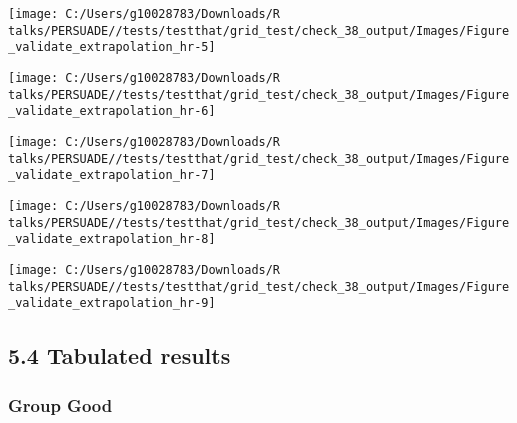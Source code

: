 \documentclass[
]{article}
\begin{document}
\begin{flushleft}\texttt{[image: C:/Users/g10028783/Downloads/R talks/PERSUADE//tests/testthat/grid\_test/check\_38\_output/Images/Figure\_validate\_extrapolation\_hr-5]} \end{flushleft}

\begin{flushleft}\texttt{[image: C:/Users/g10028783/Downloads/R talks/PERSUADE//tests/testthat/grid\_test/check\_38\_output/Images/Figure\_validate\_extrapolation\_hr-6]} \end{flushleft}

\begin{flushleft}\texttt{[image: C:/Users/g10028783/Downloads/R talks/PERSUADE//tests/testthat/grid\_test/check\_38\_output/Images/Figure\_validate\_extrapolation\_hr-7]} \end{flushleft}

\begin{flushleft}\texttt{[image: C:/Users/g10028783/Downloads/R talks/PERSUADE//tests/testthat/grid\_test/check\_38\_output/Images/Figure\_validate\_extrapolation\_hr-8]} \end{flushleft}

\begin{flushleft}\texttt{[image: C:/Users/g10028783/Downloads/R talks/PERSUADE//tests/testthat/grid\_test/check\_38\_output/Images/Figure\_validate\_extrapolation\_hr-9]} \end{flushleft}

\clearpage

\subsection{5.4 Tabulated results}\label{tabulated-results}

\subsubsection{Group Good}\label{group-good}
\end{document}
